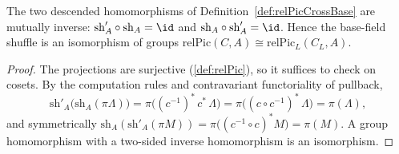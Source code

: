 \begin{theorem}
  \label{thm:relPicCrossBaseEquiv}
  \leanok
  The two descended homomorphisms of Definition~\ref{def:relPicCrossBase} are mutually
  inverse: \(\mathrm{sh}'_A \circ \mathrm{sh}_A = \id\) and
  \(\mathrm{sh}_A \circ \mathrm{sh}'_A = \id\). Hence the base-field shuffle is an
  isomorphism of groups
  \(\mathrm{relPic}(C,A) \cong \mathrm{relPic}_L(C_L, A)\).
\end{theorem}
\begin{proof}
  \leanok
  The projections are surjective (\ref{def:relPic}), so it suffices to check on
  cosets. By the computation rules and contravariant functoriality of pullback,
  \[
    \mathrm{sh}'_A\bigl(\mathrm{sh}_A(\pi \Lambda)\bigr)
      = \pi\bigl((c^{-1})^{*}\, c^{*}\, \Lambda\bigr)
      = \pi\bigl((c \circ c^{-1})^{*}\, \Lambda\bigr)
      = \pi(\Lambda),
  \]
  and symmetrically \(\mathrm{sh}_A(\mathrm{sh}'_A(\pi M)) =
  \pi\bigl((c^{-1} \circ c)^{*} M\bigr) = \pi(M)\). A group homomorphism with a
  two-sided inverse homomorphism is an isomorphism.
\end{proof}

